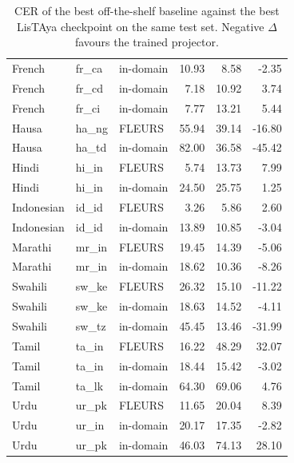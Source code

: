 \begin{table}[t]
\begin{tabular}{@{}lllrrr@{}}
French & fr\_ca & in-domain & 10.93 & 8.58 & -2.35 \\
French & fr\_cd & in-domain & 7.18 & 10.92 & 3.74 \\
French & fr\_ci & in-domain & 7.77 & 13.21 & 5.44 \\
Hausa & ha\_ng & FLEURS & 55.94 & 39.14 & -16.80 \\
Hausa & ha\_td & in-domain & 82.00 & 36.58 & -45.42 \\
Hindi & hi\_in & FLEURS & 5.74 & 13.73 & 7.99 \\
Hindi & hi\_in & in-domain & 24.50 & 25.75 & 1.25 \\
Indonesian & id\_id & FLEURS & 3.26 & 5.86 & 2.60 \\
Indonesian & id\_id & in-domain & 13.89 & 10.85 & -3.04 \\
Marathi & mr\_in & FLEURS & 19.45 & 14.39 & -5.06 \\
Marathi & mr\_in & in-domain & 18.62 & 10.36 & -8.26 \\
Swahili & sw\_ke & FLEURS & 26.32 & 15.10 & -11.22 \\
Swahili & sw\_ke & in-domain & 18.63 & 14.52 & -4.11 \\
Swahili & sw\_tz & in-domain & 45.45 & 13.46 & -31.99 \\
Tamil & ta\_in & FLEURS & 16.22 & 48.29 & 32.07 \\
Tamil & ta\_in & in-domain & 18.44 & 15.42 & -3.02 \\
Tamil & ta\_lk & in-domain & 64.30 & 69.06 & 4.76 \\
Urdu & ur\_pk & FLEURS & 11.65 & 20.04 & 8.39 \\
Urdu & ur\_in & in-domain & 20.17 & 17.35 & -2.82 \\
Urdu & ur\_pk & in-domain & 46.03 & 74.13 & 28.10 \\
\bottomrule
\end{tabular}
\caption{CER of the best off-the-shelf baseline against the best LisTAya checkpoint on the same test set. Negative $\Delta$ favours the trained projector.}
\label{tab:baselines}
\end{table}
